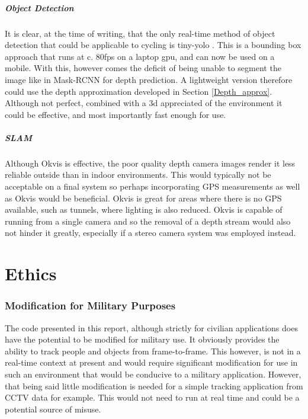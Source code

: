 \documentclass[11pt,twoside]{report}
\begin{document}
\paragraph{Object Detection} It is clear, at the time of writing, that the only real-time method of object detection that could be applicable to cycling is tiny-yolo \cite{DBLP:journals/corr/RedmonDGF15}. This is a bounding box approach that runs at c. 80fps on a laptop gpu, and can now be used on a mobile. With this, however comes the deficit of being unable to segment the image like in Mask-RCNN for depth prediction. A lightweight version therefore could use the depth approximation developed in Section \ref{Depth_approx}. Although not perfect, combined with a 3d appreciated of the environment it could be effective, and most importantly fast enough for use. 

\paragraph{SLAM} Although Okvis is effective, the poor quality depth camera images render it less reliable outside than in indoor environments. This would typically not be acceptable on a final system so perhaps incorporating GPS measurements as well as Okvis would be beneficial. Okvis is great for areas where there is no GPS available, such as tunnels, where lighting is also reduced. Okvis is capable of running from a single camera and so the removal of a depth stream would also not hinder it greatly, especially if a stereo camera system was employed instead.



\chapter{Ethics}

\subsection{Modification for Military Purposes}
The code presented in this report, although strictly for civilian applications does have the potential to be modified for military use. It obviously provides the ability to track people and objects from frame-to-frame. This however, is not in a real-time context at present and would require significant modification for use in such an environment that would be conducive to a military application. However, that being said little modification is needed for a simple tracking application from CCTV data for example. This would not need to run at real time and could be a potential source of misuse.
\end{document}

